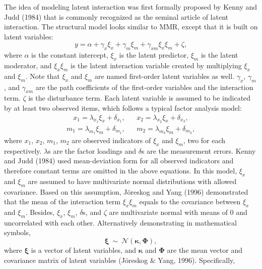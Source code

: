 \documentclass[
  11pt,
  man]{apa6}
\begin{document}
The idea of modeling latent interaction was first formally proposed by Kenny and Judd (1984) that is commonly recognized as the seminal article of latent interaction. The structural model looks similar to MMR, except that it is built on latent variables:
\begin{equation}
y = \alpha + \gamma_{x}\xi_{x} + \gamma_{m}\xi_{m} + \gamma_{xm}\xi_{x}\xi_{m} + \zeta,
\end{equation}
where \(\alpha\) is the constant intercept, \(\xi_{x}\) is the latent predictor, \(\xi_{m}\) is the latent moderator, and \(\xi_{x}\xi_{m}\) is the latent interaction variable created by multiplying \(\xi_{x}\) and \(\xi_{m}\). Note that \(\xi_{x}\) and \(\xi_{m}\) are named first-order latent variables as well. \(\gamma_{x}\), \(\gamma_{m}\), and \(\gamma_{xm}\) are the path coefficients of the first-order variables and the interaction term. \(\zeta\) is the disturbance term. Each latent variable is assumed to be indicated by at least two observed items, which follows a typical factor analysis model:
\begin{align}
x_{1} = \lambda_{x_{1}}\xi_{x} + \delta_{x_{1}}, && x_{2} = \lambda_{x_{2}}\xi_{x} + \delta_{x_{2}},
\end{align}
\begin{align}
m_{1} = \lambda_{m_{1}}\xi_{m} + \delta_{m_{1}}, && m_{2} = \lambda_{m_{2}}\xi_{m} + \delta_{m_{2}},
\end{align}
where \(x_{1}\), \(x_{2}\), \(m_{1}\), \(m_{2}\) are observed indicators of \(\xi_{x}\) and \(\xi_{m}\), two for each respectively. \(\lambda\)s are the factor loadings and \(\delta\)s are the measurement errors. Kenny and Judd (1984) used mean-deviation form for all observed indicators and therefore constant terms are omitted in the above equations. In this model, \(\xi_{x}\) and \(\xi_{m}\) are assumed to have multivariate normal distributions with allowed covariance. Based on this assumption, Jöreskog and Yang (1996) demonstrated that the mean of the interaction term \(\xi_{x}\xi_{m}\) equals to the covariance between \(\xi_{x}\) and \(\xi_{m}\). Besides, \(\xi_{x}\), \(\xi_{m}\), \(\delta\)s, and \(\zeta\) are multivariate normal with means of 0 and uncorrelated with each other. Alternatively demonstrating in mathematical symbols,
\begin{equation}
\boldsymbol{\xi} \ \sim \ \mathcal{N}(\boldsymbol{\kappa}, \boldsymbol{\Phi}), 
\end{equation}
where \(\boldsymbol{\xi}\) is a vector of latent variables, and \(\boldsymbol{\kappa}\) and \(\boldsymbol{\Phi}\) are the mean vector and covariance matrix of latent variables (Jöreskog \& Yang, 1996). Specifically,
\end{document}
